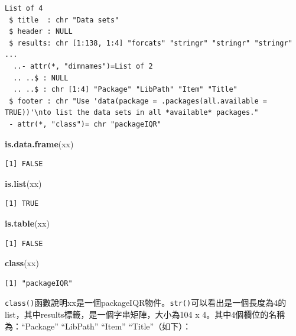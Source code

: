 \documentclass[]{book}
\newenvironment{Shaded}{\begin{snugshade}}{\end{snugshade}}
\newcommand{\KeywordTok}[1]{\textcolor[rgb]{0.13,0.29,0.53}{\textbf{#1}}}
\newcommand{\NormalTok}[1]{#1}
\theoremstyle{definition}
\theoremstyle{definition}
\theoremstyle{definition}
\theoremstyle{remark}
\begin{document}
\begin{verbatim}
List of 4
 $ title  : chr "Data sets"
 $ header : NULL
 $ results: chr [1:138, 1:4] "forcats" "stringr" "stringr" "stringr" ...
  ..- attr(*, "dimnames")=List of 2
  .. ..$ : NULL
  .. ..$ : chr [1:4] "Package" "LibPath" "Item" "Title"
 $ footer : chr "Use 'data(package = .packages(all.available = TRUE))'\nto list the data sets in all *available* packages."
 - attr(*, "class")= chr "packageIQR"
\end{verbatim}

\begin{Shaded}
\begin{Highlighting}[]
\KeywordTok{is.data.frame}\NormalTok{(xx)}
\end{Highlighting}
\end{Shaded}

\begin{verbatim}
[1] FALSE
\end{verbatim}

\begin{Shaded}
\begin{Highlighting}[]
\KeywordTok{is.list}\NormalTok{(xx)}
\end{Highlighting}
\end{Shaded}

\begin{verbatim}
[1] TRUE
\end{verbatim}

\begin{Shaded}
\begin{Highlighting}[]
\KeywordTok{is.table}\NormalTok{(xx)}
\end{Highlighting}
\end{Shaded}

\begin{verbatim}
[1] FALSE
\end{verbatim}

\begin{Shaded}
\begin{Highlighting}[]
\KeywordTok{class}\NormalTok{(xx)}
\end{Highlighting}
\end{Shaded}

\begin{verbatim}
[1] "packageIQR"
\end{verbatim}

\texttt{class()}函數說明xx是一個packageIQR物件。\texttt{str()}可以看出是一個長度為4的list，其中results標籤，是一個字串矩陣，大小為104
x 4。其中4個欄位的名稱為：``Package'' ``LibPath'' ``Item''
``Title''（如下）：
\end{document}
